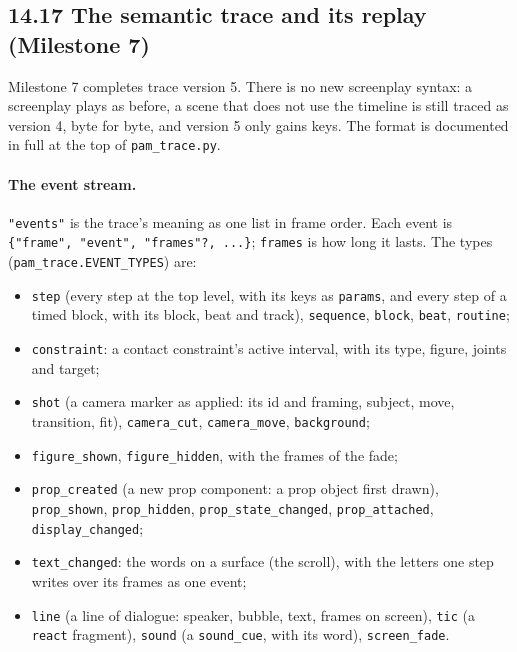 \documentclass[
  12pt,
  letterpaper,
]{book}
\providecommand{\tightlist}{%
  \setlength{\itemsep}{0pt}\setlength{\parskip}{0pt}}
\begin{document}
\subsection{14.17 The semantic trace and its replay (Milestone
7)}\label{semantic-trace}

Milestone 7 completes trace version 5. There is no new screenplay
syntax: a screenplay plays as before, a scene that does not use the
timeline is still traced as version 4, byte for byte, and version 5
only gains keys. The format is documented in full at the top of
\texttt{pam\_trace.py}.

\paragraph{The event stream.}
\texttt{"events"} is the trace's meaning as one list in frame order.
Each event is \texttt{\{"frame", "event", "frames"?, ...\}};
\texttt{frames} is how long it lasts. The types
(\texttt{pam\_trace.EVENT\_TYPES}) are:

\begin{itemize}
\tightlist
\item
  \texttt{step} (every step at the top level, with its keys as
  \texttt{params}, and every step of a timed block, with its block,
  beat and track), \texttt{sequence}, \texttt{block}, \texttt{beat},
  \texttt{routine};
\item
  \texttt{constraint}: a contact constraint's active interval, with
  its type, figure, joints and target;
\item
  \texttt{shot} (a camera marker as applied: its id and framing,
  subject, move, transition, fit), \texttt{camera\_cut},
  \texttt{camera\_move}, \texttt{background};
\item
  \texttt{figure\_shown}, \texttt{figure\_hidden}, with the frames of
  the fade;
\item
  \texttt{prop\_created} (a new prop component: a prop object first
  drawn), \texttt{prop\_shown}, \texttt{prop\_hidden},
  \texttt{prop\_state\_changed}, \texttt{prop\_attached},
  \texttt{display\_changed};
\item
  \texttt{text\_changed}: the words on a surface (the scroll), with the
  letters one step writes over its frames as one event;
\item
  \texttt{line} (a line of dialogue: speaker, bubble, text, frames on
  screen), \texttt{tic} (a \texttt{react} fragment), \texttt{sound}
  (a \texttt{sound\_cue}, with its word), \texttt{screen\_fade}.
\end{itemize}
\end{document}
